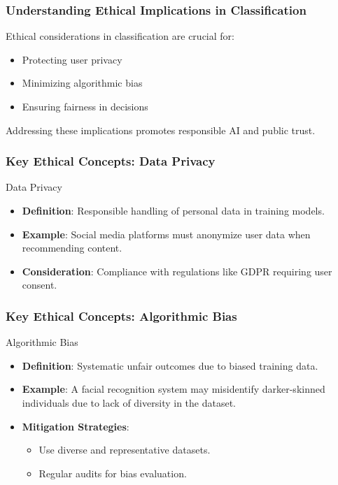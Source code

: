 \documentclass[aspectratio=169]{beamer}
\begin{document}
\begin{frame}[fragile]
    \frametitle{Understanding Ethical Implications in Classification}
    Ethical considerations in classification are crucial for:
    \begin{itemize}
        \item Protecting user privacy
        \item Minimizing algorithmic bias
        \item Ensuring fairness in decisions
    \end{itemize}
    Addressing these implications promotes responsible AI and public trust.
\end{frame}

\begin{frame}[fragile]
    \frametitle{Key Ethical Concepts: Data Privacy}
    \begin{block}{Data Privacy}
        \begin{itemize}
            \item \textbf{Definition}: Responsible handling of personal data in training models.
            \item \textbf{Example}: Social media platforms must anonymize user data when recommending content.
            \item \textbf{Consideration}: Compliance with regulations like GDPR requiring user consent.
        \end{itemize}
    \end{block}
\end{frame}

\begin{frame}[fragile]
    \frametitle{Key Ethical Concepts: Algorithmic Bias}
    \begin{block}{Algorithmic Bias}
        \begin{itemize}
            \item \textbf{Definition}: Systematic unfair outcomes due to biased training data.
            \item \textbf{Example}: A facial recognition system may misidentify darker-skinned individuals due to lack of diversity in the dataset.
            \item \textbf{Mitigation Strategies}:
                \begin{itemize}
                    \item Use diverse and representative datasets.
                    \item Regular audits for bias evaluation.
                \end{itemize}
        \end{itemize}
    \end{block}
\end{frame}
\end{document}
